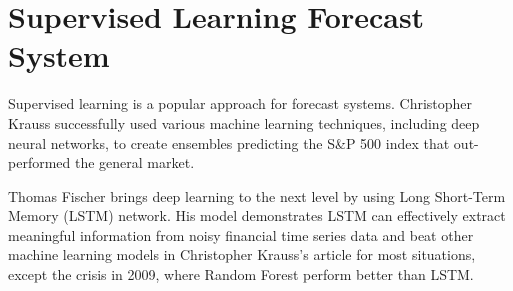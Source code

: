 \section{Supervised Learning Forecast System}
Supervised learning is a popular approach for forecast systems. Christopher Krauss successfully used various machine learning techniques, including deep neural networks, to create ensembles predicting the S\&P 500 index that out-performed the general market\cite{KRAUSS2017689}.
\par

Thomas Fischer brings deep learning to the next level by using Long Short-Term Memory (LSTM) network\cite{FISCHER2018654}. His model demonstrates LSTM can effectively extract meaningful information from noisy financial time series data and beat other machine learning models in Christopher Krauss's article\cite{KRAUSS2017689} for most situations, except the crisis in 2009, where Random Forest perform better than LSTM.
